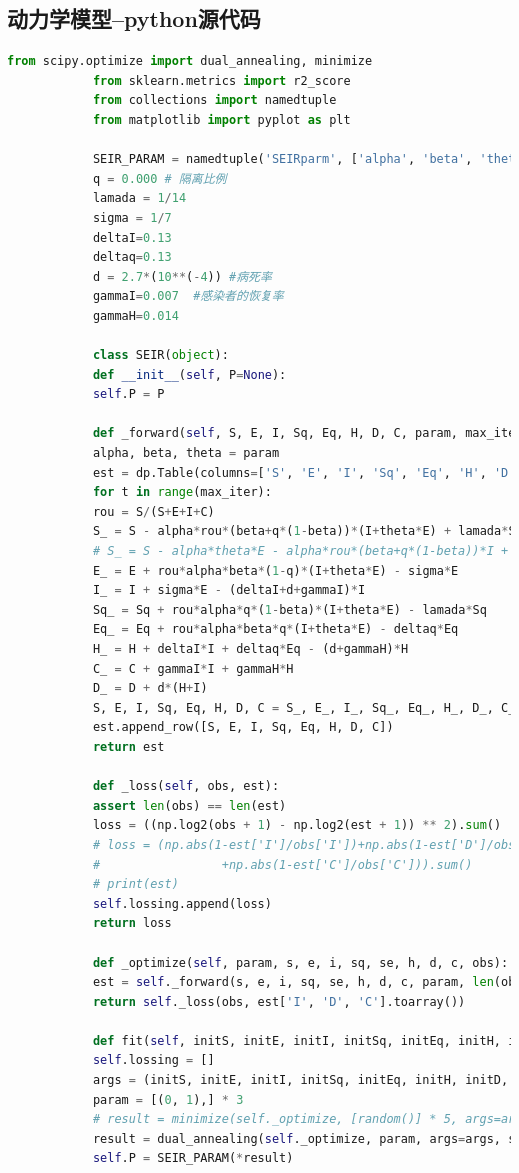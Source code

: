 \documentclass{whutmod}
\begin{document}
		\subsection*{动力学模型--python源代码}
			\begin{lstlisting}[language=python]
			from scipy.optimize import dual_annealing, minimize
			from sklearn.metrics import r2_score
			from collections import namedtuple
			from matplotlib import pyplot as plt
			
			SEIR_PARAM = namedtuple('SEIRparm', ['alpha', 'beta', 'theta'])
			q = 0.000 # 隔离比例
			lamada = 1/14
			sigma = 1/7
			deltaI=0.13
			deltaq=0.13
			d = 2.7*(10**(-4)) #病死率
			gammaI=0.007  #感染者的恢复率
			gammaH=0.014
			
			class SEIR(object):
			def __init__(self, P=None):
			self.P = P
			
			def _forward(self, S, E, I, Sq, Eq, H, D, C, param, max_iter):
			alpha, beta, theta = param
			est = dp.Table(columns=['S', 'E', 'I', 'Sq', 'Eq', 'H', 'D', 'C'])
			for t in range(max_iter):
			rou = S/(S+E+I+C)
			S_ = S - alpha*rou*(beta+q*(1-beta))*(I+theta*E) + lamada*Sq
			# S_ = S - alpha*theta*E - alpha*rou*(beta+q*(1-beta))*I + lamada*Sq
			E_ = E + rou*alpha*beta*(1-q)*(I+theta*E) - sigma*E
			I_ = I + sigma*E - (deltaI+d+gammaI)*I
			Sq_ = Sq + rou*alpha*q*(1-beta)*(I+theta*E) - lamada*Sq
			Eq_ = Eq + rou*alpha*beta*q*(I+theta*E) - deltaq*Eq
			H_ = H + deltaI*I + deltaq*Eq - (d+gammaH)*H
			C_ = C + gammaI*I + gammaH*H
			D_ = D + d*(H+I)
			S, E, I, Sq, Eq, H, D, C = S_, E_, I_, Sq_, Eq_, H_, D_, C_
			est.append_row([S, E, I, Sq, Eq, H, D, C])
			return est
			
			def _loss(self, obs, est):
			assert len(obs) == len(est)
			loss = ((np.log2(obs + 1) - np.log2(est + 1)) ** 2).sum() 
			# loss = (np.abs(1-est['I']/obs['I'])+np.abs(1-est['D']/obs['D'])
			#                 +np.abs(1-est['C']/obs['C'])).sum()
			# print(est)
			self.lossing.append(loss)
			return loss
			
			def _optimize(self, param, s, e, i, sq, se, h, d, c, obs):
			est = self._forward(s, e, i, sq, se, h, d, c, param, len(obs))
			return self._loss(obs, est['I', 'D', 'C'].toarray())
			
			def fit(self, initS, initE, initI, initSq, initEq, initH, initD, initC, Y):
			self.lossing = []
			args = (initS, initE, initI, initSq, initEq, initH, initD, initC, Y['确诊', '死亡', '治愈'].toarray())
			param = [(0, 1),] * 3
			# result = minimize(self._optimize, [random()] * 5, args=args, bounds=param)['x']
			result = dual_annealing(self._optimize, param, args=args, seed=30, maxiter=50)['x']
			self.P = SEIR_PARAM(*result)
			

\end{lstlisting}
\end{document}
